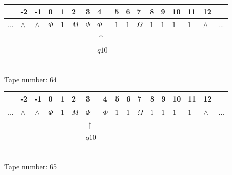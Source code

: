 \documentclass[11pt]{article}
\begin{document}
\begin{table}[H]
\centering
\begin{tabular}{lllllllllllllllll}
 & -2 & -1 & 0 & 1 & 2 & 3 & 4 & 5 & 6 & 7 & 8 & 9 & 10 & 11 & 12 & \\
\hline
$...$ & \multicolumn{1}{|l|}{$\wedge$} & \multicolumn{1}{|l|}{$\wedge$} & \multicolumn{1}{|l|}{$\Phi$} & \multicolumn{1}{|l|}{$1$} & \multicolumn{1}{|l|}{$M$} & \multicolumn{1}{|l|}{$\Psi$} & \multicolumn{1}{|l|}{$\Phi$} & \multicolumn{1}{|l|}{$1$} & \multicolumn{1}{|l|}{$1$} & \multicolumn{1}{|l|}{$\Omega$} & \multicolumn{1}{|l|}{$1$} & \multicolumn{1}{|l|}{$1$} & \multicolumn{1}{|l|}{$1$} & \multicolumn{1}{|l|}{$1$} & \multicolumn{1}{|l|}{$\wedge$} & $...$\\
\hline
&  &  &  &  &  &  & $\uparrow$ &  &  &  &  &  &  &  &  &  \\
&  &  &  &  &  &  & $ q10 $ &  &  &  &  &  &  &  &  &  \\
\end{tabular}
\\
Tape number: 64
\noindent\makebox[\linewidth]{\hdashrule{\textwidth}{1pt}{1pt}}\end{table}

\begin{table}[H]
\centering
\begin{tabular}{lllllllllllllllll}
 & -2 & -1 & 0 & 1 & 2 & 3 & 4 & 5 & 6 & 7 & 8 & 9 & 10 & 11 & 12 & \\
\hline
$...$ & \multicolumn{1}{|l|}{$\wedge$} & \multicolumn{1}{|l|}{$\wedge$} & \multicolumn{1}{|l|}{$\Phi$} & \multicolumn{1}{|l|}{$1$} & \multicolumn{1}{|l|}{$M$} & \multicolumn{1}{|l|}{$\Psi$} & \multicolumn{1}{|l|}{$\Phi$} & \multicolumn{1}{|l|}{$1$} & \multicolumn{1}{|l|}{$1$} & \multicolumn{1}{|l|}{$\Omega$} & \multicolumn{1}{|l|}{$1$} & \multicolumn{1}{|l|}{$1$} & \multicolumn{1}{|l|}{$1$} & \multicolumn{1}{|l|}{$1$} & \multicolumn{1}{|l|}{$\wedge$} & $...$\\
\hline
&  &  &  &  &  & $\uparrow$ &  &  &  &  &  &  &  &  &  &  \\
&  &  &  &  &  & $ q10 $ &  &  &  &  &  &  &  &  &  &  \\
\end{tabular}
\\
Tape number: 65
\noindent\makebox[\linewidth]{\hdashrule{\textwidth}{1pt}{1pt}}\end{table}
\clearpage
\end{document}

